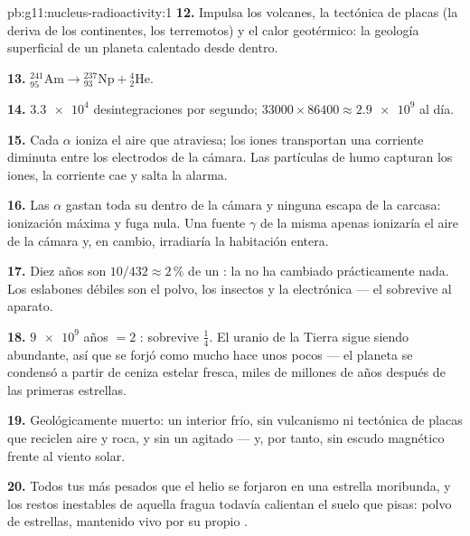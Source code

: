 \begin{solution}{pb:g11:nucleus-radioactivity:1}
\textbf{12.} Impulsa los volcanes, la tectónica de placas (la deriva de
los continentes, los terremotos) y el calor geotérmico: la geología
superficial de un planeta calentado desde dentro.

\textbf{13.} ${}^{241}_{95}\mathrm{Am} \to {}^{237}_{93}\mathrm{Np} +
{}^{4}_{2}\mathrm{He}$.

\textbf{14.} $\num{3.3e4}$ desintegraciones por segundo;
$\num{33000} \times 86400 \approx \num{2.9e9}$ al día.

\textbf{15.} Cada $\alpha$ ioniza el aire que atraviesa; los iones
transportan una corriente diminuta entre los electrodos de la cámara.
Las partículas de humo capturan los iones, la corriente cae y salta la
alarma.

\textbf{16.} Las $\alpha$ gastan toda su  dentro de la cámara y
ninguna escapa de la carcasa: ionización máxima y fuga nula. Una fuente
$\gamma$ de la misma  apenas ionizaría el aire de la cámara y,
en cambio, irradiaría la habitación entera.

\textbf{17.} Diez años son $10/432 \approx 2\,\%$ de un : la
 no ha cambiado prácticamente nada. Los eslabones débiles son
el polvo, los insectos y la electrónica --- el  sobrevive al
aparato.

\textbf{18.} $\num{9e9}$ años $= 2$ : sobrevive $\frac14$. El
uranio de la Tierra sigue siendo abundante, así que se forjó como mucho
hace unos pocos  --- el planeta se condensó a partir de ceniza
estelar fresca, miles de millones de años después de las primeras
estrellas.

\textbf{19.} Geológicamente muerto: un interior frío, sin vulcanismo ni
tectónica de placas que reciclen aire y roca, y sin un  agitado
--- y, por tanto, sin escudo magnético frente al viento solar.

\textbf{20.} Todos tus  más pesados que el helio se forjaron en
una estrella moribunda, y los restos inestables de aquella fragua
todavía calientan el suelo que pisas: polvo de estrellas, mantenido vivo
por su propio .
\end{solution}
